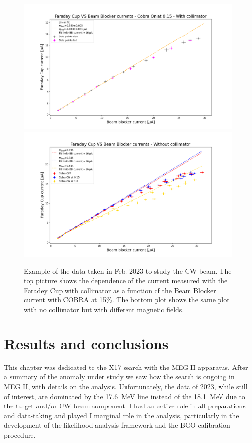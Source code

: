 \begin{refsection}
        \begin{figure}
            \centering
            \includegraphics[width = \textwidth]{Figures/X17/H2+/Faraday_Cup_VS_Beam_Blocker_currents_-_Cobra_On_at_0.15_-_With_collimator.png}\\
            \includegraphics[width = \textwidth]{Figures/X17/H2+/Faraday_Cup_VS_Beam_Blocker_currents_-_Without_collimator.png}
            \caption{Example of the data taken in Feb. 2023 to study the CW beam. The top picture shows the dependence of the current measured with the Faradey Cup with collimator as a function of the Beam Blocker current with COBRA at 15\%. The bottom plot shows the same plot with no collimator but with different magnetic fields.}
            \label{fig:X17:H2+}
        \end{figure}

\section{Results and conclusions}
    This chapter was dedicated to the X17 search with the MEG II apparatus.
    After a summary of the anomaly under study we saw how the search is ongoing in MEG II, with details on the analysis. 
    Unfortunately, the data of 2023, while still of interest, are dominated by the \SI{17.6}{MeV} line instead of the \SI{18.1}{MeV} due to the target and/or  CW beam component. 
    I had an active role in all preparations and data-taking and played I marginal role in the analysis, particularly in the development of the likelihood analysis framework and the BGO calibration procedure.\\
    

\end{refsection}
